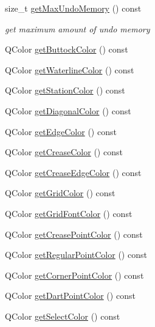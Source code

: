 \begin{DoxyCompactItemize}
size\+\_\+t \hyperlink{classShipCAD_1_1Preferences_a8ddfbabd8be21f6390f3750600047a87}{get\+Max\+Undo\+Memory} () const 
\begin{DoxyCompactList}\small\item\em get maximum amount of undo memory \end{DoxyCompactList}\item 
Q\+Color \hyperlink{classShipCAD_1_1Preferences_aa34f502af478c340ff359c76b90620c0}{get\+Buttock\+Color} () const 
\item 
Q\+Color \hyperlink{classShipCAD_1_1Preferences_a518043b34395026be6ebcf8f4e6e6591}{get\+Waterline\+Color} () const 
\item 
Q\+Color \hyperlink{classShipCAD_1_1Preferences_a39e4abd32055512f8009f4c8ab5cd379}{get\+Station\+Color} () const 
\item 
Q\+Color \hyperlink{classShipCAD_1_1Preferences_a238b56f29c89be9c2d9533cb9db21552}{get\+Diagonal\+Color} () const 
\item 
Q\+Color \hyperlink{classShipCAD_1_1Preferences_a45b78b4d109d2060ae7dd2c6da4e91df}{get\+Edge\+Color} () const 
\item 
Q\+Color \hyperlink{classShipCAD_1_1Preferences_a2d894224f95d2eff87f3086e23ae95a4}{get\+Crease\+Color} () const 
\item 
Q\+Color \hyperlink{classShipCAD_1_1Preferences_a98a2931bbf4565d110243b5c4bdca0ca}{get\+Crease\+Edge\+Color} () const 
\item 
Q\+Color \hyperlink{classShipCAD_1_1Preferences_a02a4e2aeef1d1cc16bc4a22525737866}{get\+Grid\+Color} () const 
\item 
Q\+Color \hyperlink{classShipCAD_1_1Preferences_a97b3c3d9765e4b726f20f9853d4843dd}{get\+Grid\+Font\+Color} () const 
\item 
Q\+Color \hyperlink{classShipCAD_1_1Preferences_a840bb1cce012154934fbc0996c962d45}{get\+Crease\+Point\+Color} () const 
\item 
Q\+Color \hyperlink{classShipCAD_1_1Preferences_ab4d0669d6b1a05d186b0556026e418f4}{get\+Regular\+Point\+Color} () const 
\item 
Q\+Color \hyperlink{classShipCAD_1_1Preferences_a69824380ffc1ee52bcf534604a904a96}{get\+Corner\+Point\+Color} () const 
\item 
Q\+Color \hyperlink{classShipCAD_1_1Preferences_a9b691361f319df40380305752d18af45}{get\+Dart\+Point\+Color} () const 
\item 
Q\+Color \hyperlink{classShipCAD_1_1Preferences_af54f177e516849e7f8212841db9b1ed8}{get\+Select\+Color} () const 

\end{DoxyCompactItemize}

